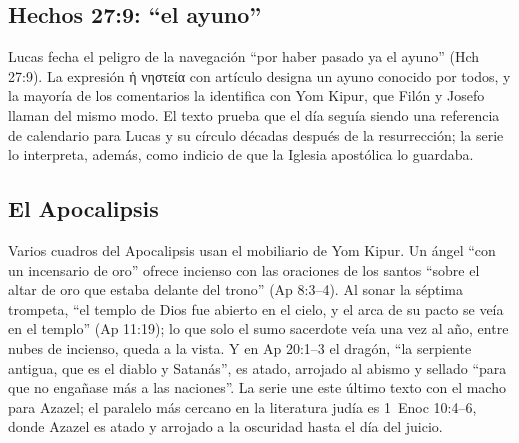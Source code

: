 \documentclass[11pt,letterpaper]{article}
\newcommand{\grc}[1]{\foreignlanguage{ancientgreek}{#1}}
\begin{document}
\subsection{Hechos 27:9: ``el ayuno''}
Lucas fecha el peligro de la navegación ``por haber pasado ya el ayuno'' (Hch 27:9). La expresión \grc{ἡ νηστεία} con artículo designa un ayuno conocido por todos, y la mayoría de los comentarios la identifica con Yom Kipur, que Filón y Josefo llaman del mismo modo. El texto prueba que el día seguía siendo una referencia de calendario para Lucas y su círculo décadas después de la resurrección; la serie lo interpreta, además, como indicio de que la Iglesia apostólica lo guardaba.

\subsection{El Apocalipsis}
Varios cuadros del Apocalipsis usan el mobiliario de Yom Kipur. Un ángel ``con un incensario de oro'' ofrece incienso con las oraciones de los santos ``sobre el altar de oro que estaba delante del trono'' (Ap 8:3--4). Al sonar la séptima trompeta, ``el templo de Dios fue abierto en el cielo, y el arca de su pacto se veía en el templo'' (Ap 11:19); lo que solo el sumo sacerdote veía una vez al año, entre nubes de incienso, queda a la vista. Y en Ap 20:1--3 el dragón, ``la serpiente antigua, que es el diablo y Satanás'', es atado, arrojado al abismo y sellado ``para que no engañase más a las naciones''. La serie une este último texto con el macho para Azazel; el paralelo más cercano en la literatura judía es 1~Enoc 10:4--6, donde Azazel es atado y arrojado a la oscuridad hasta el día del juicio.
\end{document}
